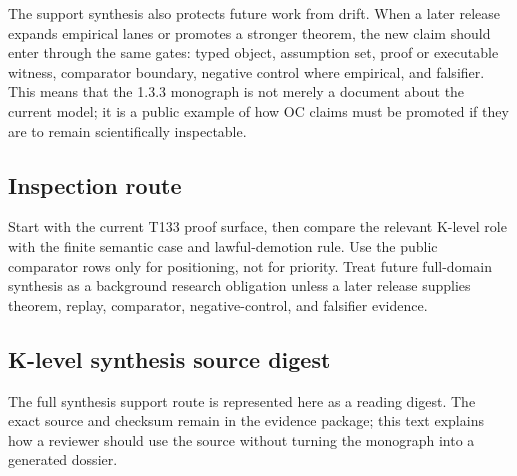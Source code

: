 The support synthesis also protects future work from drift. When a later release expands empirical lanes or promotes a stronger theorem, the new claim should enter through the same gates: typed object, assumption set, proof or executable witness, comparator boundary, negative control where empirical, and falsifier. This means that the 1.3.3 monograph is not merely a document about the current model; it is a public example of how OC claims must be promoted if they are to remain scientifically inspectable.


\subsection{Inspection route}

Start with the current T133 proof surface, then compare the relevant K-level role with the finite semantic case and lawful-demotion rule. Use the public comparator rows only for positioning, not for priority. Treat future full-domain synthesis as a background research obligation unless a later release supplies theorem, replay, comparator, negative-control, and falsifier evidence.


\subsection{K-level synthesis source digest}

The full synthesis support route is represented here as a reading digest. The exact source and checksum remain in the evidence package; this text explains how a reviewer should use the source without turning the monograph into a generated dossier.
